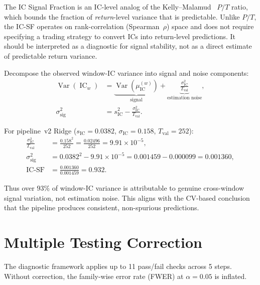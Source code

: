 \documentclass[11pt,a4paper]{article}
\theoremstyle{definition}
\newcommand{\IC}{\operatorname{IC}}
\newcommand{\Var}{\operatorname{Var}}
\begin{document}
The IC Signal Fraction is an IC-level analog of the
Kelly--Malamud~\cite{kelly2013} $P/T$ ratio, which bounds the fraction
of \emph{return}-level variance that is predictable.  Unlike $P/T$, the
IC-SF operates on rank-correlation (Spearman~$\rho$) space and does not
require specifying a trading strategy to convert ICs into return-level
predictions.  It should be interpreted as a diagnostic for signal
stability, not as a direct estimate of predictable return variance.

Decompose the observed window-IC variance into signal and noise
components:
\begin{align}
    \Var(\IC_{w}) &= \underbrace{\Var(\mu_{\IC}^{(w)})}_{\text{signal}}
                   + \underbrace{\frac{\sigma_{\IC}^{2}}{T_{\text{val}}}}
                                  _{\text{estimation noise}}, \\[4pt]
    \sigma_{\text{sig}}^{2} &= s_{\IC}^{2}
                             - \frac{\sigma_{\IC}^{2}}{T_{\text{val}}}.
\end{align}

For pipeline~v2 Ridge ($s_{\IC}=0.0382$, $\sigma_{\IC}=0.158$,
$T_{\text{val}}=252$):
\begin{align}
    \frac{\sigma_{\IC}^{2}}{T_{\text{val}}}
        &= \frac{0.158^{2}}{252}
         = \frac{0.02496}{252}
         = 9.91 \times 10^{-5}, \\[4pt]
    \sigma_{\text{sig}}^{2} &= 0.0382^{2} - 9.91\times10^{-5}
                             = 0.001459 - 0.000099
                             = 0.001360, \\[4pt]
    \text{IC-SF} &= \frac{0.001360}{0.001459} = 0.932.
\end{align}

Thus over $93\%$ of window-IC variance is attributable to genuine
cross-window signal variation, not estimation noise. This aligns with
the CV-based conclusion that the pipeline produces consistent,
non-spurious predictions.

\section{Multiple Testing Correction}
\label{sec:multitest}

The diagnostic framework applies up to 11 pass/fail checks across
5 steps. Without correction, the family-wise error rate (FWER) at
$\alpha=0.05$ is inflated.
\end{document}
